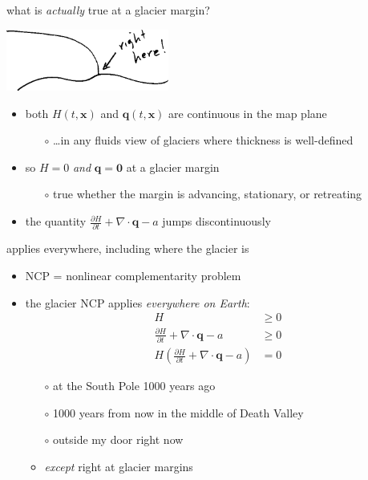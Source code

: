 \documentclass[10pt,hyperref,dvipsnames]{beamer}
\newcommand{\bq}{\mathbf{q}}
\newcommand{\bx}{\mathbf{x}}
\newcommand{\bzero}{\bm{0}}
\newcommand{\Div}{\nabla\cdot}
\begin{document}
\begin{frame}{what is \emph{actually} true at a glacier margin?}

\begin{center}
\includegraphics[width=0.4\textwidth]{figs/margin.png}
\end{center}

\bigskip
\begin{itemize}
\item \alert{both $H(t,\bx)$ and $\bq(t,\bx)$ are continuous in the map plane}
    \begin{itemize}
    \item[$\circ$] \dots in any fluids view of glaciers where thickness is well-defined
    \end{itemize}

\medskip
\item so $H=0$ \emph{and} $\bq=\bzero$ at a glacier margin
    \begin{itemize}
    \item[$\circ$] true whether the margin is advancing, stationary, or retreating
    \end{itemize}

\medskip
\item the quantity \quad $\frac{\partial H}{\partial t} + \Div \bq - a$ \quad jumps discontinuously
\end{itemize}
\end{frame}


\begin{frame}{applies everywhere, including where the glacier is}
\begin{itemize}
\item NCP = nonlinear complementarity problem
\item the glacier NCP applies \emph{everywhere on Earth}:
\begin{align*}
H &\ge 0 \\
\frac{\partial H}{\partial t} + \Div \bq - a &\ge 0 \\
H \left(\frac{\partial H}{\partial t} + \Div \bq - a\right) &= 0
\end{align*}
    \begin{itemize}
    \item[$\circ$] at the South Pole 1000 years ago
    \item[$\circ$] 1000 years from now in the middle of Death Valley
    \item[$\circ$] outside my door right now

    \medskip
    \item<2>[$\circ$] \emph{except} right at glacier margins
    \end{itemize}
\end{itemize}
\end{frame}
\end{document}
